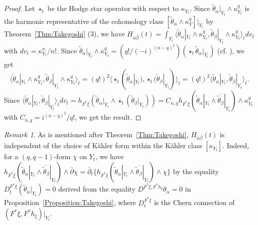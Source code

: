 \documentclass[amscd, leqno]{amsart}
\theoremstyle{plain}
\theoremstyle{definition}
\theoremstyle{remark}
\newtheorem{remark}[theorem]{Remark}
\newenvironment{pf}{\begin{proof}}{\end{proof}}
\begin{document}
\begin{pf}
Let $\star_{t}$ be the Hodge star operator with respect to $\kappa_{Y_{t}}$.
Since $\widetilde{\theta}_{\alpha}|_{Y_{t}} \wedge \kappa_{Y_{t}}^{q}$ is the harmonic representative of the cohomology class 
$[\widetilde{\theta}_{\alpha} \wedge \kappa_{Y}^{q}]|_{Y_{t}}$ by Theorem~\ref{Thm:Takegoshi} (3), we have
$H_{\alpha\bar{\beta}}(t) 
= \int_{Y_{t}} \langle \widetilde{\theta}_{\alpha}|_{Y_{t}} \wedge \kappa_{Y_{t}}^{q} , \widetilde{\theta}_{\beta}|_{Y_{t}} 
\wedge\kappa_{Y_{t}}^{q} \rangle_{t} dv_{t}$ with $dv_{t}=\kappa_{Y_{t}}^{n}/n!$.
Since $\widetilde{\theta}_{\alpha}|_{Y_{t}} \wedge \kappa_{Y_{t}}^{q} = (q!/(-i)^{(n-q)^{2}}) (\star_{t} \widetilde{\theta}_{\alpha}|_{Y_{t}})$ 
(cf. \cite[Cor.\,2.2 (1)]{MourouganeTakayama08}), we get 
$$
\langle \widetilde{\theta}_{\alpha}|_{Y_{t}}\wedge\kappa_{Y_{t}}^{q}, \widetilde{\theta}_{\beta}|_{Y_{t}}\wedge\kappa_{Y_{t}}^{q} \rangle_{t}
=
(q!)^{2} \langle \star_{t}( \widetilde{\theta}_{\alpha}|_{Y_{t}}), \star_{t}(\widetilde{\theta}_{\beta}|_{Y_{t}}) \rangle_{t}
=
(q!)^{2} \langle \widetilde{\theta}_{\alpha}|_{Y_{t}}, \widetilde{\theta}_{\beta}|_{Y_{t}} \rangle_{t}.
$$
Since
$\langle \widetilde{\theta}_{\alpha}|_{Y_{t}}, \widetilde{\theta}_{\beta}|_{Y_{t}} \rangle_{t} dv_{t} 
= h_{F^{*}\xi}( \widetilde{\theta}_{\alpha}|_{Y_{t}} \wedge \overline{\star}_{t} ( \widetilde{\theta}_{\beta}|_{Y_{t}}) )
= C_{n,q} h_{F^{*}\xi}( \widetilde{\theta}_{\alpha}|_{Y_{t}} \wedge \overline{\widetilde{\theta}_{\beta}}|_{Y_{t}} ) 
\wedge \kappa_{Y_{t}}^{q}$ with $C_{n,q} = i^{(n-q)^{2}}/q!$, we get the result.
\end{pf}


\begin{remark}
As is mentioned after Theorem~\ref{Thm:Takegoshi}, $H_{\alpha\bar{\beta}}(t)$ is independent of the choice of K\"ahler form
within the K\"ahler class $[\kappa_{Y_{t}}]$. Indeed, for a $(q, q-1)$-form $\chi$ on $Y_{t}$, we have 
$h_{F^{*}\xi}( \widetilde{\theta}_{\alpha}|_{Y_{t}} \wedge \overline{\widetilde{\theta}_{\beta}}|_{Y_{t}} ) \wedge \bar{\partial}\chi
= \bar{\partial}_{t}\{ h_{F^{*}\xi}( \widetilde{\theta}_{\alpha}|_{Y_{t}} \wedge \overline{\widetilde{\theta}_{\beta}}|_{Y_{t}} ) \wedge \chi \}$
by the equality $D^{F^{*}\xi}_{t} (\widetilde{\theta}_{\alpha}|_{Y_{t}}) =0$ derived from the equality $D^{F^{*}\xi, F^{*}h_{\xi}}\theta_{\alpha} =0$
in Proposition~\ref{Proposition:Takegoshi}, where $D^{F^{*}\xi}_{t}$ is the Chern connection of $(F^{*}\xi, F^{*}h_{\xi})|_{Y_{t}}$.
\end{remark}
\end{document}
